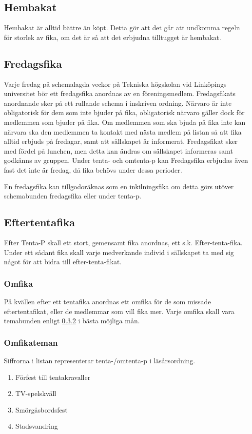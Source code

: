 \documentclass{article}
\begin{document}
\subsection{Hembakat} %
Hembakat är alltid bättre än köpt. Detta gör att det går att undkomma regeln för
storlek av fika, om det är så att det erbjudna tilltugget är hembakat.

\subsection{Fredagsfika} \label{fredagsfika} %
Varje fredag på schemalagda veckor på Tekniska högskolan vid Linköpings
universitet bör ett fredagsfika anordnas av en föreningsmedlem. Fredagsfikats
anordnande sker på ett rullande schema i inskriven ordning. Närvaro är inte
obligatorisk för dem som inte bjuder på fika, obligatorisk närvaro gäller dock
för medlemmen som bjuder på fika. Om medlemmen som ska bjuda på fika inte kan
närvara ska den medlemmen ta kontakt med nästa medlem på listan så att fika
alltid erbjuds på fredagar, samt att sällskapet är informerat. Fredagsfikat sker
med fördel på lunchen, men detta kan ändras om sällskapet informeras samt
godkänns av gruppen. Under tenta- och omtenta-p kan Fredagsfika erbjudas även
fast det inte är fredag, då fika behövs under dessa perioder.

En fredagsfika kan tillgodoräknas som en inkilningsfika om detta görs utöver
schemabunden fredagsfika eller under tenta-p.

\subsection{Eftertentafika} %
Efter Tenta-P skall ett stort, gemensamt fika anordnas, ett s.k.
Efter-tenta-fika. Under ett sådant fika skall varje medverkande individ i
sällskapet ta med sig något för att bidra till efter-tenta-fikat.

\subsubsection{Omfika}
På kvällen efter ett tentafika anordnas ett omfika för de som missade
eftertentafikat, eller de medlemmar som vill fika mer. Varje omfika skall vara
temabunden enligt \ref{omfikateman} i bästa möjliga mån.

\subsubsection{Omfikateman} \label{omfikateman}
Siffrorna i listan representerar tenta-/omtenta-p i läsårsordning.
\begin{enumerate}
  \item Förfest till tentakravaller
  \item TV-spelskväll
  \item Smörgåsbordsfest
  \item Stadsvandring
\end{enumerate}
\end{document}
